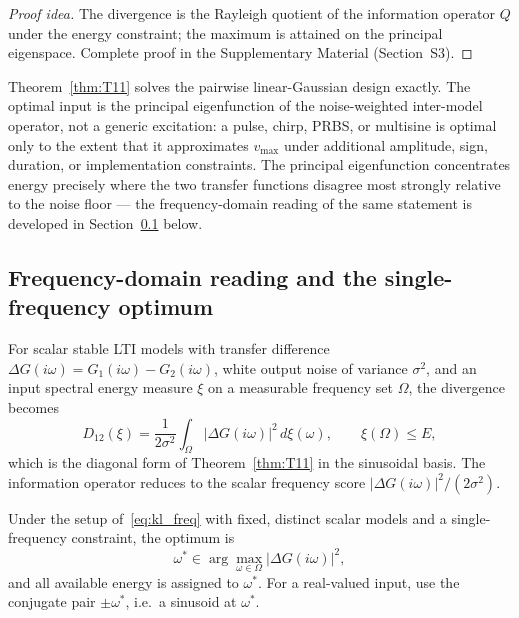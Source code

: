\begin{proof}[Proof idea]
The divergence is the Rayleigh quotient of the information operator $Q$ under the energy constraint; the maximum is attained on the principal eigenspace. Complete proof in the Supplementary Material (Section~S3).
\end{proof}

\begin{remark}
Theorem~\ref{thm:T11} solves the pairwise linear-Gaussian design exactly. The optimal input is the principal eigenfunction of the noise-weighted inter-model operator, not a generic excitation: a pulse, chirp, PRBS, or multisine is optimal only to the extent that it approximates \(v_{\max}\) under additional amplitude, sign, duration, or implementation constraints. The principal eigenfunction concentrates energy precisely where the two transfer functions disagree most strongly relative to the noise floor --- the frequency-domain reading of the same statement is developed in Section~\ref{sec:freq_design} below.
\end{remark}

\subsection{Frequency-domain reading and the single-frequency optimum}
\label{sec:freq_design}

For scalar stable LTI models with transfer difference \(\Delta G(i\omega) = G_1(i\omega) - G_2(i\omega)\), white output noise of variance \(\sigma^2\), and an input spectral energy measure \(\xi\) on a measurable frequency set \(\Omega\), the divergence becomes
\begin{equation}
D_{12}(\xi) = \frac{1}{2\sigma^2} \int_{\Omega} |\Delta G(i\omega)|^2\, d\xi(\omega),
\qquad \xi(\Omega) \le E,
\label{eq:kl_freq}
\end{equation}
which is the diagonal form of Theorem~\ref{thm:T11} in the sinusoidal basis. The information operator reduces to the scalar frequency score \(|\Delta G(i\omega)|^2 / (2\sigma^2)\).

\begin{corollary}
\label{cor:single_freq}
Under the setup of~\eqref{eq:kl_freq} with fixed, distinct scalar models and a single-frequency constraint, the optimum is
\[
\omega^{*} \in \arg\max_{\omega \in \Omega} |\Delta G(i\omega)|^2,
\]
and all available energy is assigned to \(\omega^{*}\). For a real-valued input, use the conjugate pair \(\pm\omega^{*}\), i.e.\ a sinusoid at \(\omega^{*}\).
\end{corollary}

